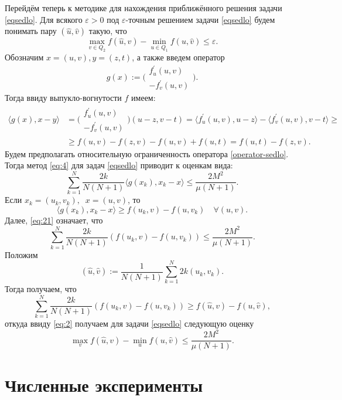     Перейдём теперь к методике для нахождения приближённого решения задачи \eqref{eqsedlo}. Для всякого $\varepsilon > 0$ под $\varepsilon$-точным решением задачи \eqref{eqsedlo} будем понимать пару $(\widehat{u}, \widehat{v})$ такую, что $$\max_{v \in Q_2} f(\widehat{u}, v) - \min_{u \in Q_1} f(u, \widehat{v}) \leq \varepsilon.$$ Обозначим $x = (u, v), y = (z, t)$, а также введем оператор 
    \begin{equation}\label{operator-sedlo}
        g(x) := \Bigg( 
        \begin{aligned}
            f^{'}_{u}(u,v)\\
            -f^{'}_{v}(u,v)
        \end{aligned}
        \Bigg).
    \end{equation}
    Тогда ввиду выпукло-вогнутости $f$ имеем: 
    \begin{equation}
    \begin{aligned}
        \langle g(x), x - y \rangle &=
         \Bigg( 
        \begin{aligned}
            f^{'}_{u}(u,v)\\
            -f^{'}_{v}(u,v)
        \end{aligned}
        \Bigg)
         (u - z, v - t)  = \langle f^{'}_{u}(u,v), u - z \rangle - \langle f^{'}_{v}(u,v), v - t \rangle \geq \\&
         \geq f(u, v) - f(z, v) 
        - f(u, v)+ f(u, t)=  f(u,t) - f(z, v).
    \end{aligned}
    \end{equation}
    Будем предполагать относительную ограниченность оператора \eqref{operator-sedlo}. Тогда метод \eqref{eq:4} для задач \eqref{eqsedlo} приводит к оценкам вида:
    \begin{equation} \label{eq:21}
        \sum_{k=1}^{N} \frac{2k}{N(N+1)} \langle g(x_k), x_k -x\rangle \leq \frac{2 M^2}{\mu (N+1)}.
    \end{equation}
    Если $x_k = (u_k, v_k), \;\; x = (u, v)$, то  
    \begin{equation}
        \langle g(x_k), x_k -x\rangle \geq f(u_k,v) - f(u, v_k) \quad \forall (u, v).
    \end{equation}
    Далее, \eqref{eq:21} означает, что 
    \begin{equation}
        \sum_{k=1}^{N} \frac{2k}{N(N+1)} (f(u_k,v) - f(u, v_k)) \leq \frac{2M^2}{\mu (N+1)}.
    \end{equation}
    Положим
    \begin{equation}
        (\widehat{u}, \widehat{v}) := \frac{1}{N(N+1)} \sum_{k=1}^{N} 2k (u_k,v_k).
    \end{equation}
    Тогда получаем, что
    \begin{equation}
        \sum_{k=1}^{N} \frac{2k}{N(N+1)} (f(u_k, v) - f(u, v_k)) \geq f(\widehat{u}, v) - f(u, \widehat{v}), 
    \end{equation}
    откуда ввиду \eqref{eq:2} получаем для задачи \eqref{eqsedlo} следующую оценку
    \begin{equation}
        \max_{v} f(\widehat{u}, v) - \min_{u} f(u, \widehat{v}) \leq \frac{2M^2}{\mu (N+1)}.
    \end{equation}

\section{Численные эксперименты} \label{sec:ch2/sec4}

\FloatBarrier